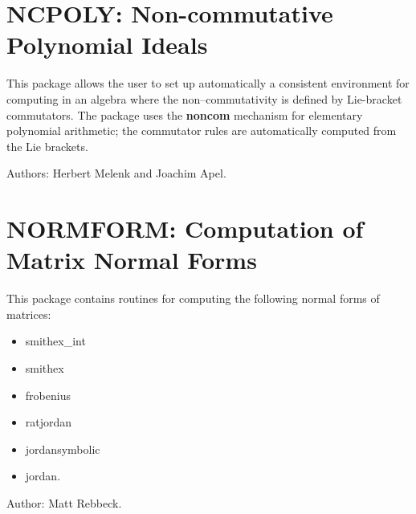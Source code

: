 

\newpage

\section{NCPOLY: Non-commutative Polynomial Ideals}

This package allows the user to set up automatically a consistent
environment for computing in an algebra where the non--commutativity is
defined by Lie-bracket commutators.  The package uses the {\REDUCE} \textbf{noncom}
mechanism for elementary polynomial arithmetic; the commutator
rules are automatically computed from the Lie brackets.

Authors: Herbert Melenk and Joachim Apel.



\newpage

\section{NORMFORM: Computation of \texorpdfstring{\\}{}Matrix Normal Forms}
\label{NORMFORM}

This package contains routines for computing the following
normal forms of matrices:
\begin{itemize}
\item smithex\_int
\item smithex
\item frobenius
\item ratjordan
\item jordansymbolic
\item jordan.
\end{itemize}

Author: Matt Rebbeck.



\iffalse
\newpage

